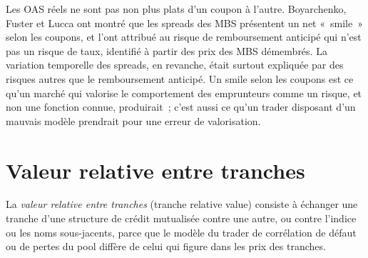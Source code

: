 \begin{omfigure}

\label{fig:s2:mortgage-and-structured-credit-strategies:oas}
\end{omfigure}

Les OAS réels ne sont pas non plus plats d'un coupon à l'autre. Boyarchenko, Fuster et Lucca ont montré que les spreads des MBS présentent un net «~smile~» selon les coupons, et
l'ont attribué au risque de remboursement anticipé qui n'est pas un risque de taux, identifié à partir des prix des MBS démembrés. La variation temporelle des
spreads, en revanche, était surtout expliquée par des risques autres que le remboursement anticipé. Un smile selon les coupons est ce qu'un marché qui valorise le comportement des emprunteurs comme
un risque, et non une fonction connue, produirait~; c'est aussi ce qu'un trader disposant d'un mauvais modèle prendrait pour une erreur de valorisation.

\section{Valeur relative entre tranches}

\begin{definition}\label{def:s2:mortgage-and-structured-credit-strategies:tranchrv}
La \emph{valeur relative entre tranches} (tranche relative value) consiste à échanger une tranche d'une structure de crédit mutualisée contre une autre, ou contre
l'indice ou les noms sous-jacents, parce que le modèle du trader de corrélation de défaut ou de pertes du pool diffère de celui
qui figure dans les prix des tranches.
\end{definition}

